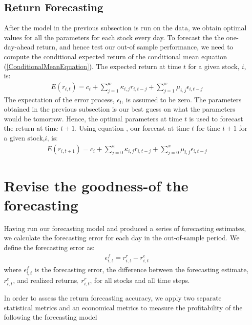 \subsection*{Return Forecasting}

After the model in the previous subsection is run on the data, we obtain optimal values for all the parameters for each stock every day. To forecast the the one-day-ahead return, and hence test our out-of sample performance, we need to compute the conditional expected return of the conditional mean equation (\ref{ConditionalMeanEquation}). The expected return at time $t$ for a given stock, $i$, is:
\begin{align} 
    E(r_{i,t})=c_i+\sum_{j=1}^w\kappa_{i,j} r_{i,t-j}+\sum_{j=1}^w\mu_{i,j} \epsilon_{i,t-j} \label{ExpectedConditionalMean}
\end{align}
The expectation of the error process, $\epsilon_t$, is assumed to be zero. The parameters obtained in the previous subsection is our best guess on what the parameters would be tomorrow. Hence, the optimal parameters at time $t$ is used to forecast the return at time $t+1$. Using equation \label{ExpectedConditionalMean}, our forecast at time $t$ for time $t+1$ for a given stock,$i$, is:
\begin{align} 
    E(r_{i,t+1})=c_i+\sum_{j=0}^w\kappa_{i,j} r_{i,t-j}+\sum_{j=0}^x\mu_{i,j} \epsilon_{i,t-j}
\end{align}

\section*{Revise the goodness-of the forecasting}
Having run our forecasting model and produced a series of forecasting estimates, we calculate the forecasting error for each day in the out-of-sample period. We define the forecasting error as:
\begin{align}
    \epsilon_{i,t}^{f} = r_{i,t}^{r} - r_{i,t}^{e}
\end{align}
where $\epsilon_{i,t}^{f}$ is the forecasting error, the difference between the forecasting estimate, $r_{i,t}^{e}$, and realized returns, $r_{i,t}^{r}$, for all stocks and all time steps.

In order to assess the return forecasting accuracy, we apply two separate statistical metrics and an economical metrics to measure the profitability of the following the forecasting model 

